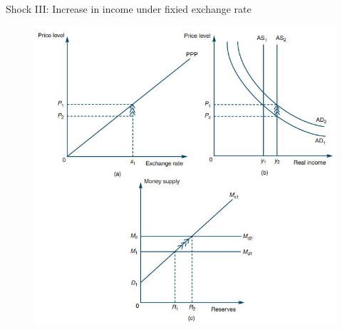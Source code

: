 \documentclass[10pt,hyperref={CJKbookmarks=true},xcolor=dvipsnames,aspectratio=169]{beamer}
\begin{document}
\begin{frame}{Shock III: Increase in income under fixied exchange rate}


\begin{figure}


\includegraphics[scale=0.4]{fig/boptheory/lec08-22.JPG}

\end{figure}

\end{frame}
\end{document}
